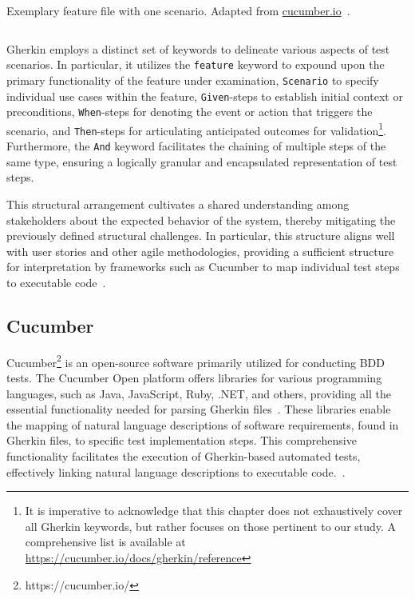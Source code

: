 \begin{listing}[!ht]
\caption{Exemplary feature file with one scenario. Adapted from 
\href{https://cucumber.io/blog/bdd/getting-started-with-bdd-part-1/}{cucumber.io}~\cite{noauthor_getting_nodate}.}
\label{lst:withdrawcash}
\inputminted[linenos, xleftmargin=2em]{gherkin}{files/code/atm.feature}
\end{listing}

 Gherkin employs a distinct set of keywords to delineate various aspects of test scenarios. In particular, it utilizes the \texttt{feature} keyword to expound upon the primary functionality of the feature under examination, \texttt{Scenario} to specify individual use cases within the feature, \texttt{Given}-steps to establish initial context or preconditions, \texttt{When}-steps for denoting the event or action that triggers the scenario, and \texttt{Then}-steps for articulating anticipated outcomes for validation\footnote{It is imperative to acknowledge that this chapter does not exhaustively cover all Gherkin keywords, but rather focuses on those pertinent to our study. A comprehensive list is available at \href{https://cucumber.io/docs/gherkin/reference/\#keywords}{https://cucumber.io/docs/gherkin/reference}}. Furthermore, the \texttt{And} keyword facilitates the chaining of multiple steps of the same type, ensuring a logically granular and encapsulated representation of test steps. 
 
 This structural arrangement cultivates a shared understanding among stakeholders about the expected behavior of the system, thereby mitigating the previously defined structural challenges. In particular, this structure aligns well with user stories and other agile methodologies, providing a sufficient structure for interpretation by frameworks such as Cucumber to map individual test steps to executable code~\cite{noauthor_gherkin_nodate}.


\subsection{Cucumber}
\label{subsec:cucumber}
Cucumber\footnote{https://cucumber.io/} is an open-source software primarily utilized for conducting \ac{BDD} tests. The Cucumber Open platform offers libraries for various programming languages, such as Java, JavaScript, Ruby, .NET, and others, providing all the essential functionality needed for parsing Gherkin files~\cite{noauthor_cucumber_nodate}. These libraries enable the mapping of natural language descriptions of software requirements, found in Gherkin files, to specific test implementation steps. This comprehensive functionality facilitates the execution of Gherkin-based automated tests, effectively linking natural language descriptions to executable code.~\cite{wynne2012cucumber}.

